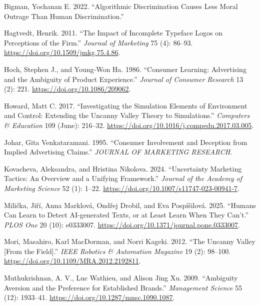 \documentclass[
  letterpaper,
  DIV=11,
  numbers=noendperiod]{scrartcl}
\newlength{\cslhangindent}
\newenvironment{CSLReferences}[2] %
 {\begin{list}{}{%
  \setlength{\itemindent}{0pt}
  \setlength{\leftmargin}{0pt}
  \setlength{\parsep}{0pt}
  \ifodd #1
   \setlength{\leftmargin}{\cslhangindent}
   \setlength{\itemindent}{-1\cslhangindent}
  \fi
  \setlength{\itemsep}{#2\baselineskip}}}
 {\end{list}}
\begin{document}
\label{refs}
\begin{CSLReferences}{1}{0}
Bigman, Yochanan E. 2022. {``Algorithmic {Discrimination Causes Less
Moral Outrage Than Human Discrimination}.''}

Hagtvedt, Henrik. 2011. {``The {Impact} of {Incomplete Typeface Logos}
on {Perceptions} of the {Firm}.''} \emph{Journal of Marketing} 75 (4):
86--93. \url{https://doi.org/10.1509/jmkg.75.4.86}.

Hoch, Stephen J., and Young-Won Ha. 1986. {``Consumer {Learning}:
{Advertising} and the {Ambiguity} of {Product Experience}.''}
\emph{Journal of Consumer Research} 13 (2): 221.
\url{https://doi.org/10.1086/209062}.

Howard, Matt C. 2017. {``Investigating the Simulation Elements of
Environment and Control: {Extending} the {Uncanny Valley Theory} to
Simulations.''} \emph{Computers \& Education} 109 (June): 216--32.
\url{https://doi.org/10.1016/j.compedu.2017.03.005}.

Johar, Gita Venkataramani. 1995. {``Consumer {Involvement} and
{Deception} from {Implied Advertising Claims}.''} \emph{JOURNAL OF
MARKETING RESEARCH}.

Kovacheva, Aleksandra, and Hristina Nikolova. 2024. {``Uncertainty
Marketing Tactics: {An} Overview and a Unifying Framework.''}
\emph{Journal of the Academy of Marketing Science} 52 (1): 1--22.
\url{https://doi.org/10.1007/s11747-023-00941-7}.

Milička, Jiří, Anna Marklová, Ondřej Drobil, and Eva Pospíšilová. 2025.
{``Humans Can Learn to Detect {AI-generated} Texts, or at Least Learn
When They Can't.''} \emph{PLOS One} 20 (10): e0333007.
\url{https://doi.org/10.1371/journal.pone.0333007}.

Mori, Masahiro, Karl MacDorman, and Norri Kageki. 2012. {``The {Uncanny
Valley} {[}{From} the {Field}{]}.''} \emph{IEEE Robotics \& Automation
Magazine} 19 (2): 98--100.
\url{https://doi.org/10.1109/MRA.2012.2192811}.

Muthukrishnan, A. V., Luc Wathieu, and Alison Jing Xu. 2009.
{``Ambiguity {Aversion} and the {Preference} for {Established
Brands}.''} \emph{Management Science} 55 (12): 1933--41.
\url{https://doi.org/10.1287/mnsc.1090.1087}.


\end{CSLReferences}
\end{document}
